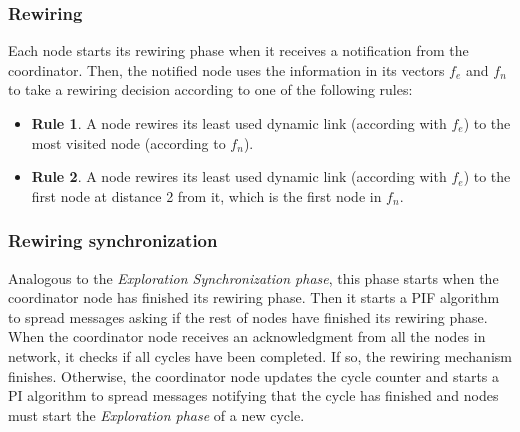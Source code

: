 \subsubsection{Rewiring}

Each node starts its rewiring phase when it receives a notification from the coordinator. Then, the notified node uses the information in its vectors $f_e$ and $f_n$ to take a rewiring decision according to one of the following rules:
\begin{itemize}
    \item \textbf{Rule 1}. A node rewires its least used dynamic link (according with $f_e$) to the most visited node (according to $f_n$).
    \item \textbf{Rule 2}. A node rewires its least used dynamic link (according with $f_e$) to the first node at distance 2 from it, which is the first node in $f_n$.
\end{itemize}

\subsubsection{Rewiring synchronization}

Analogous to the \textit{Exploration Synchronization phase}, this phase starts when the coordinator node has finished its rewiring phase. Then it starts a PIF algorithm to spread messages asking if the rest of nodes have finished its rewiring phase. When the coordinator node receives an acknowledgment from all the nodes in network, it checks if all cycles have been completed. If so, the rewiring mechanism finishes. Otherwise, the coordinator node updates the cycle counter and starts a PI algorithm to spread messages notifying that the cycle has finished and nodes must start the \textit{Exploration phase} of a new cycle.
